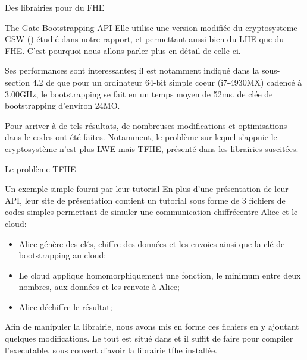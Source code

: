\begin{section}{Des librairies pour du FHE}
\begin{subsection}{The Gate Bootstrapping API}
Elle utilise une version modifiée du cryptosysteme GSW (\cite{C:GenSahWat13})
étudié dans notre rapport, et permettant aussi bien du LHE que du FHE. C'est
pourquoi nous allons parler plus en détail de celle-ci.

Ses performances sont interessantes; il est notamment indiqué dans la sous-section
4.2 de \cite{cryptoeprint:2016:870} que pour un ordinateur 64-bit simple coeur 
(i7-4930MX) cadencé à 3.00GHz, le bootstrapping se fait en un temps moyen de 52ms.
de clée de bootstrapping d'environ 24MO.

Pour arriver à de tels résultats, de nombreuses modifications et optimisations dans le codes 
ont été faites. Notamment, le problème sur lequel s'appuie le cryptosystème n'est plus 
LWE mais TFHE, présenté dans les librairies suscitées.

\begin{subsubsection}{Le problème TFHE}
\end{subsubsection} %
\begin{subsubsection}{Un exemple simple fourni par leur tutorial}
En plus d'une présentation de leur API, leur site de présentation
contient un tutorial sous forme de 3 fichiers de codes simples 
permettant de simuler une \fg communication chiffrée\fg entre Alice et le cloud:
\begin{itemize}
\item Alice génère des clés, chiffre des données et les envoies ainsi
	que la clé de bootstrapping au cloud;
\item Le cloud applique homomorphiquement une fonction, le minimum
	entre deux nombres, aux données et les renvoie à Alice;
\item Alice déchiffre le résultat;
\end{itemize}
Afin de manipuler la librairie, nous avons \og mis en forme \fg ces fichiers
en y ajoutant quelques modifications. Le tout est situé dans 
 et il suffit de faire  
pour compiler l'executable, sous couvert d'avoir la librairie tfhe installée.
	

\end{subsubsection}
\end{subsection}
\end{section}
